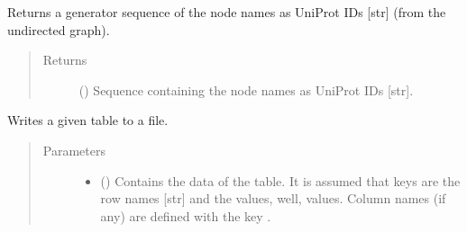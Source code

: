\documentclass[letterpaper,10pt,english]{sphinxmanual}
\begin{document}
\begin{fulllineitems}
\begin{fulllineitems}
\end{fulllineitems}


\begin{fulllineitems}
\label{\detokenize{reference:pypath.main.PyPath.vsup}}
Returns a generator sequence of the node names as UniProt IDs
{[}str{]} (from the undirected graph).
\begin{quote}\begin{description}
\item[{Returns}] \leavevmode
() \textendash{} Sequence containing the node names as
UniProt IDs {[}str{]}.

\end{description}\end{quote}

\end{fulllineitems}


\begin{fulllineitems}
\label{\detokenize{reference:pypath.main.PyPath.wang_effects}}
\end{fulllineitems}


\begin{fulllineitems}
\label{\detokenize{reference:pypath.main.PyPath.write_table}}
Writes a given table to a file.
\begin{quote}\begin{description}
\item[{Parameters}] \leavevmode\begin{itemize}
\item {} 
 () \textendash{} Contains the data of the table. It is assumed that keys are
the row names {[}str{]} and the values, well, values. Column
names (if any) are defined with the key .


\end{itemize}
\end{description}
\end{quote}
\end{fulllineitems}
\end{fulllineitems}
\end{document}
